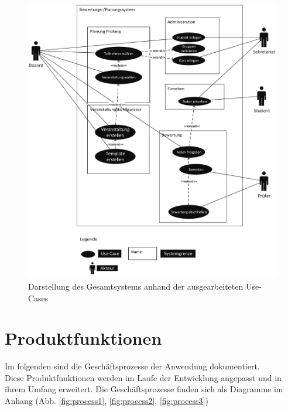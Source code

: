 	\begin{figure}[th!]
	\centering
	\includegraphics[width=\textwidth]{./img/use_case}
	\caption{Darstellung des Gesamtsystems anhand der ausgearbeiteten Use-Cases}
	\label{fig:use_case}
	\end{figure}
	\newpage
	
	\section{Produktfunktionen\label{chap:Prfunk}}
	Im folgenden sind die Geschäftsprozesse der Anwendung dokumentiert.\\
	Diese Produktfunktionen werden im Laufe der Entwicklung angepasst und in ihrem Umfang erweitert.
	Die Geschäftsprozesse finden sich als Diagramme im Anhang (Abb. \ref{fig:process1}, \ref{fig:process2}, \ref{fig:process3})
	
